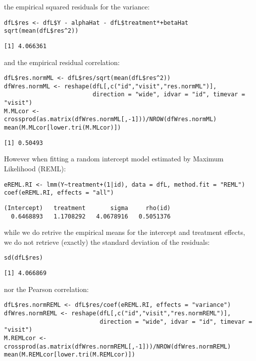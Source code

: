\documentclass[12pt]{article}
\begin{document}
the empirical squared residuals for the variance:
\lstset{language=r,label= ,caption= ,captionpos=b,numbers=none}
\begin{lstlisting}
dfL$res <- dfL$Y - alphaHat - dfL$treatment*+betaHat
sqrt(mean(dfL$res^2))
\end{lstlisting}

\begin{verbatim}
[1] 4.066361
\end{verbatim}


and the empirical residual correlation:
\lstset{language=r,label= ,caption= ,captionpos=b,numbers=none}
\begin{lstlisting}
dfL$res.normML <- dfL$res/sqrt(mean(dfL$res^2))
dfWres.normML <- reshape(dfL[,c("id","visit","res.normML")],
                         direction = "wide", idvar = "id", timevar = "visit")
M.MLcor <- crossprod(as.matrix(dfWres.normML[,-1]))/NROW(dfWres.normML)
mean(M.MLcor[lower.tri(M.MLcor)])
\end{lstlisting}

\begin{verbatim}
[1] 0.50493
\end{verbatim}


However when fitting a random intercept model estimated by Maximum
Likelihood (REML):
\lstset{language=r,label= ,caption= ,captionpos=b,numbers=none}
\begin{lstlisting}
eREML.RI <- lmm(Y~treatment+(1|id), data = dfL, method.fit = "REML")
coef(eREML.RI, effects = "all")
\end{lstlisting}

\begin{verbatim}
(Intercept)   treatment       sigma     rho(id) 
  0.6468893   1.1708292   4.0678916   0.5051376
\end{verbatim}


while we do retrive the empirical means for the intercept and
treatment effects, we do not retrieve (exactly) the standard deviation
of the residuals:
\lstset{language=r,label= ,caption= ,captionpos=b,numbers=none}
\begin{lstlisting}
sd(dfL$res)
\end{lstlisting}

\begin{verbatim}
[1] 4.066869
\end{verbatim}


nor the Pearson correlation:
\lstset{language=r,label= ,caption= ,captionpos=b,numbers=none}
\begin{lstlisting}
dfL$res.normREML <- dfL$res/coef(eREML.RI, effects = "variance")
dfWres.normREML <- reshape(dfL[,c("id","visit","res.normREML")],
                           direction = "wide", idvar = "id", timevar = "visit")
M.REMLcor <- crossprod(as.matrix(dfWres.normREML[,-1]))/NROW(dfWres.normREML)
mean(M.REMLcor[lower.tri(M.REMLcor)])
\end{lstlisting}
\end{document}
